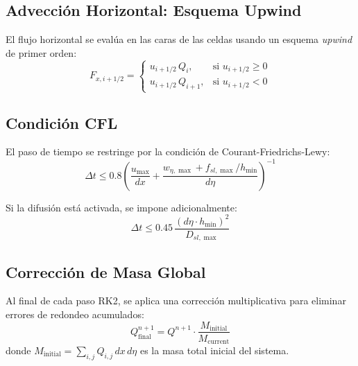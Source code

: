 \documentclass[11pt,a4paper]{article}
\begin{document}
\subsection{Advección Horizontal: Esquema Upwind}
El flujo horizontal se evalúa en las caras de las celdas usando un esquema \emph{upwind} de primer orden:
\begin{equation}
    F_{x, i+1/2} = \begin{cases}
        u_{i+1/2} \, Q_i, & \text{si } u_{i+1/2} \ge 0 \\
        u_{i+1/2} \, Q_{i+1}, & \text{si } u_{i+1/2} < 0
    \end{cases}
\end{equation}

\subsection{Condición CFL}
El paso de tiempo se restringe por la condición de Courant-Friedrichs-Lewy:
\begin{equation}
    \Delta t \le 0.8 \left(\frac{u_{\max}}{dx} + \frac{w_{\eta,\max} + f_{sl,\max}/h_{\min}}{d\eta}\right)^{-1}
\end{equation}

Si la difusión está activada, se impone adicionalmente:
\begin{equation}
    \Delta t \le 0.45 \, \frac{(d\eta \cdot h_{\min})^2}{D_{sl,\max}}
\end{equation}

\subsection{Corrección de Masa Global}
Al final de cada paso RK2, se aplica una corrección multiplicativa para eliminar errores de redondeo acumulados:
\begin{equation}
    Q^{n+1}_{\text{final}} = Q^{n+1} \cdot \frac{M_{\text{initial}}}{M_{\text{current}}}
\end{equation}
donde $M_{\text{initial}} = \sum_{i,j} Q_{i,j} \, dx \, d\eta$ es la masa total inicial del sistema.
\end{document}
